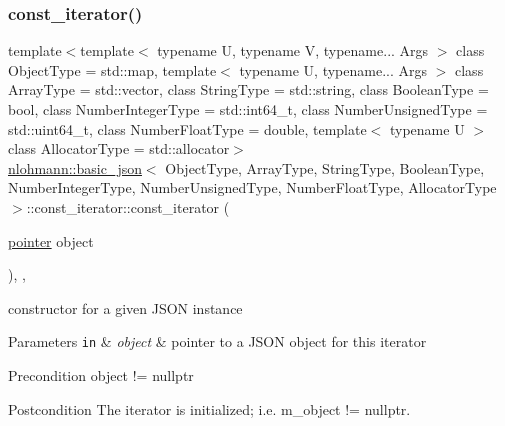 \subsubsection{\texorpdfstring{const\+\_\+iterator()}{const\_iterator()}\hspace{0.1cm}{\footnotesize\ttfamily [1/3]}}
{\footnotesize\ttfamily template$<$template$<$ typename U, typename V, typename... Args $>$ class Object\+Type = std\+::map, template$<$ typename U, typename... Args $>$ class Array\+Type = std\+::vector, class String\+Type  = std\+::string, class Boolean\+Type  = bool, class Number\+Integer\+Type  = std\+::int64\+\_\+t, class Number\+Unsigned\+Type  = std\+::uint64\+\_\+t, class Number\+Float\+Type  = double, template$<$ typename U $>$ class Allocator\+Type = std\+::allocator$>$ \\
\hyperlink{classnlohmann_1_1basic__json}{nlohmann\+::basic\+\_\+json}$<$ Object\+Type, Array\+Type, String\+Type, Boolean\+Type, Number\+Integer\+Type, Number\+Unsigned\+Type, Number\+Float\+Type, Allocator\+Type $>$\+::const\+\_\+iterator\+::const\+\_\+iterator (\begin{DoxyParamCaption}\item[{\hyperlink{classnlohmann_1_1basic__json_1_1const__iterator_a1da96fc3054d547e7706d3a2f073f389}{pointer}}]{object }\end{DoxyParamCaption})\hspace{0.3cm}{\ttfamily [inline]}, {\ttfamily [explicit]}, {\ttfamily [noexcept]}}



constructor for a given J\+S\+ON instance 


\begin{DoxyParams}[1]{Parameters}
\mbox{\tt in}  & {\em object} & pointer to a J\+S\+ON object for this iterator \\
\hline
\end{DoxyParams}
\begin{DoxyPrecond}{Precondition}
object != nullptr 
\end{DoxyPrecond}
\begin{DoxyPostcond}{Postcondition}
The iterator is initialized; i.\+e. {\ttfamily m\+\_\+object != nullptr}. 
\end{DoxyPostcond}
\mbox{\label{classnlohmann_1_1basic__json_1_1const__iterator_a6b950c6bc081ac1ec1540ec05ceb2603}} 
